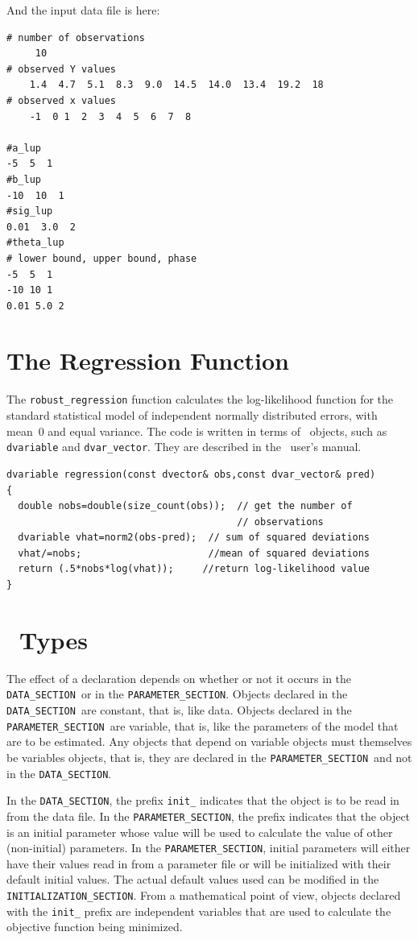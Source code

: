 \documentclass{admbmanual}
\newcommand\DS{\texttt{DATA\_SECTION}}
\newcommand\PS{\texttt{PARAMETER\_SECTION}}
\begin{document}
And the input data file is here:

\begin{lstlisting}
# number of observations
     10
# observed Y values
    1.4  4.7  5.1  8.3  9.0  14.5  14.0  13.4  19.2  18 
# observed x values
    -1  0 1  2  3  4  5  6  7  8        

#a_lup
-5  5  1
#b_lup
-10  10  1
#sig_lup
0.01  3.0  2
#theta_lup
# lower bound, upper bound, phase
-5  5  1
-10 10 1
0.01 5.0 2
\end{lstlisting}


\appendix

\chapter{The Regression Function}\label{ch:appendix-regression-function}

The \texttt{robust\_regression} function calculates the log-likelihood function
for the standard statistical model of independent normally distributed errors,
with mean~0 and equal variance. The code is written in terms of \scAD\ objects,
such as \texttt{dvariable} and \texttt{dvar\_vector}. They are described in the
\scAD\ user's manual.
\begin{lstlisting}
dvariable regression(const dvector& obs,const dvar_vector& pred)
{
  double nobs=double(size_count(obs));  // get the number of
                                        // observations
  dvariable vhat=norm2(obs-pred);  // sum of squared deviations
  vhat/=nobs;                      //mean of squared deviations
  return (.5*nobs*log(vhat));     //return log-likelihood value
}
\end{lstlisting}

\chapter{\ADM\ Types}

The effect of a declaration depends on whether or not it occurs in the \DS\ or
in the \PS. Objects declared in the \DS\ are constant, that is, like data.
Objects declared in the \PS\ are variable, that is, like the parameters of the
model that are to be estimated. Any objects that depend on variable objects must
themselves be variables objects, that is, they are declared in the \PS\ and not
in the \DS.

In the \DS, the prefix \texttt{init\_} indicates that the object is to be read
in from the data file. In the \PS, the prefix indicates that the object is an
initial parameter whose value will be used to calculate the value of other
(non-initial) parameters. In the \PS, initial parameters will either have their
values read in from a parameter file or will be initialized with their default
initial values. The actual default values used can be modified in the
\texttt{INITIALIZATION\_SECTION}. From a mathematical point of view, objects
declared with the \texttt{init\_} prefix are independent variables that are used
to calculate the objective function being minimized.
\end{document}
